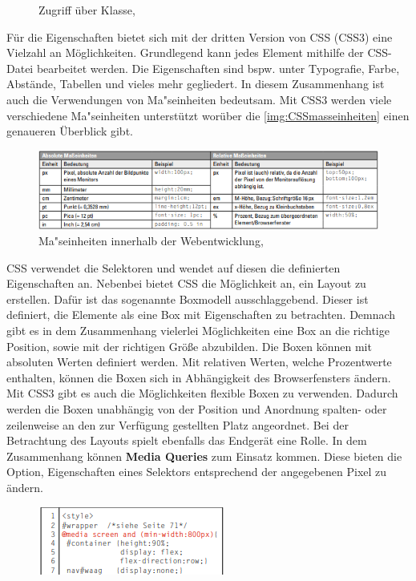 \documentclass[a4paper,titlepage,halfparskip,12pt]{scrreprt}
\begin{document}
\begin{onehalfspacing}
\begin{figure}[h]
\begin{minipage}[c]{.4\textwidth}
		\caption{Zugriff über Klasse, \cite{buhler2017html5}} %
		\label{img:CSSClass}
	\end{minipage}
\end{figure}
Für die Eigenschaften bietet sich mit der dritten Version von \ac{CSS} (\ac{CSS}3) eine Vielzahl an Möglichkeiten. Grundlegend kann jedes Element mithilfe der \ac{CSS}-Datei bearbeitet werden. Die Eigenschaften sind bspw. unter Typografie, Farbe, Abstände, Tabellen und vieles mehr gegliedert. In diesem Zusammenhang ist auch die Verwendungen von Ma"seinheiten bedeutsam. Mit \ac{CSS}3 werden viele verschiedene Ma"seinheiten unterstützt worüber die \autoref{img:CSSmasseinheiten} einen genaueren Überblick gibt.
\begin{figure}[h]
	\centering
	\includegraphics[scale=1.8]{images/CSSmasseinheiten}
	\caption{Ma"seinheiten innerhalb der Webentwicklung, \cite{buhler2017html5}} 
	\label{img:CSSmasseinheiten}
\end{figure}
\ac{CSS} verwendet die Selektoren und wendet auf diesen die definierten Eigenschaften an. Nebenbei bietet \ac{CSS} die Möglichkeit an, ein Layout zu erstellen. Dafür ist das sogenannte Boxmodell ausschlaggebend. Dieser ist definiert, die Elemente als eine Box mit Eigenschaften zu betrachten. Demnach gibt es in dem Zusammenhang vielerlei Möglichkeiten eine Box an die richtige Position, sowie mit der richtigen Größe abzubilden. Die Boxen können mit absoluten Werten definiert werden. Mit relativen Werten, welche Prozentwerte enthalten, können die Boxen sich in Abhängigkeit des Browserfensters ändern. Mit \ac{CSS}3 gibt es auch die Möglichkeiten flexible Boxen zu verwenden. Dadurch werden die Boxen unabhängig von der Position und Anordnung spalten- oder zeilenweise an den zur Verfügung gestellten Platz angeordnet. Bei der Betrachtung des Layouts spielt ebenfalls das Endgerät eine Rolle. In dem Zusammenhang können \textbf{Media Queries} zum Einsatz kommen. Diese bieten die Option, Eigenschaften eines Selektors entsprechend der angegebenen Pixel zu ändern.
\begin{figure}[h]
	\centering
	\includegraphics[scale=2.8]{images/MediaQbsp}

\end{figure}
\end{onehalfspacing}
\end{document}
